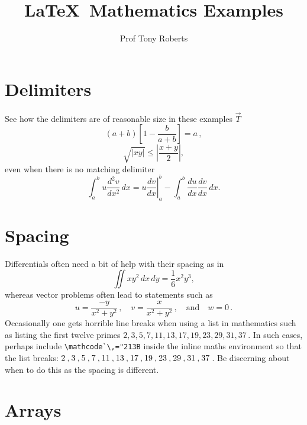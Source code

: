 \documentclass[20pt,a4paper]{article}
\title{\LaTeX\ Mathematics Examples}
\author{Prof Tony Roberts}
\begin{document}
\maketitle

\tableofcontents



\section{Delimiters}

See how the delimiters are of reasonable size in these examples $\vec T$
\[
\left(a+b\right)\left[1-\frac{b}{a+b}\right]=a\,,
\]
\[
\sqrt{|xy|}\leq\left|\frac{x+y}{2}\right|,
\]
even when there is no matching delimiter
\[
\int_a^bu\frac{d^2v}{dx^2}\,dx
=\left.u\frac{dv}{dx}\right|_a^b
-\int_a^b\frac{du}{dx}\frac{dv}{dx}\,dx.
\]






\section{Spacing}

Differentials often need a bit of help with their spacing as in
\[
\iint xy^2\,dx\,dy 
=\frac{1}{6}x^2y^3,
\]
whereas vector problems often lead to statements such as
\[
u=\frac{-y}{x^2+y^2}\,,\quad
v=\frac{x}{x^2+y^2}\,,\quad\text{and}\quad
w=0\,.
\]
Occasionally one gets horrible line breaks when using a list in mathematics such as listing the first twelve primes  \(2,3,5,7,11,13,17,19,23,29,31,37\)\,.
In such cases, perhaps include \verb|\mathcode`\,="213B| inside the inline maths environment so that the list breaks: \(\mathcode`\,="213B 2,3,5,7,11,13,17,19,23,29,31,37\)\,.
Be discerning about when to do this as the spacing is different.






\section{Arrays}
\end{document}
